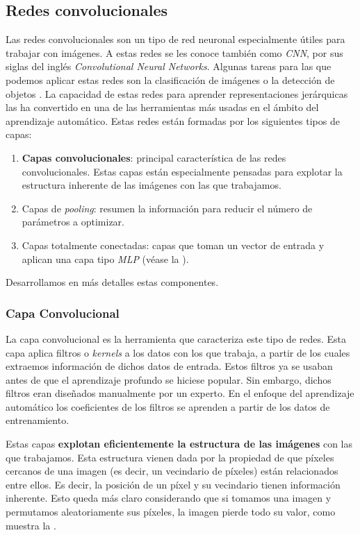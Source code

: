\subsection{Redes convolucionales}

Las redes convolucionales son un tipo de red neuronal especialmente útiles para trabajar con imágenes. A estas redes se les conoce también como \textit{CNN}, por sus siglas del inglés \textit{Convolutional Neural Networks}. Algunas tareas para las que podemos aplicar estas redes son la clasificación de imágenes o la detección de objetos \cite{informatica:paper_definicion_cnn}. La capacidad de estas redes para aprender representaciones jerárquicas las ha convertido en una de las herramientas más usadas en el ámbito del aprendizaje automático. Estas redes están formadas por los siguientes tipos de capas:

\begin{enumerate}
	\item \textbf{Capas convolucionales}: principal característica de las redes convolucionales. Estas capas están especialmente pensadas para explotar la estructura inherente de las imágenes con las que trabajamos.
	\item Capas de \textit{pooling}: resumen la información para reducir el número de parámetros a optimizar.
	\item Capas totalmente conectadas: capas que toman un vector de entrada y aplican una capa tipo \textit{MLP} (véase la ).
\end{enumerate}

Desarrollamos en más detalles estas componentes.

\subsubsection{Capa Convolucional}

La capa convolucional es la herramienta que caracteriza este tipo de redes. Esta capa aplica filtros o \textit{kernels} a los datos con los que trabaja, a partir de los cuales extraemos información de dichos datos de entrada. Estos filtros ya se usaban antes de que el aprendizaje profundo se hiciese popular. Sin embargo, dichos filtros eran diseñados manualmente por un experto. En el enfoque del aprendizaje automático los coeficientes de los filtros se aprenden a partir de los datos de entrenamiento.

Estas capas \textbf{explotan eficientemente la estructura de las imágenes} con las que trabajamos. Esta estructura vienen dada por la propiedad de que píxeles cercanos de una imagen (es decir, un vecindario de píxeles) están relacionados entre ellos. Es decir, la posición de un píxel y su vecindario tienen información inherente. Esto queda más claro considerando que si tomamos una imagen y permutamos aleatoriamente sus píxeles, la imagen pierde todo su valor, como muestra la .

